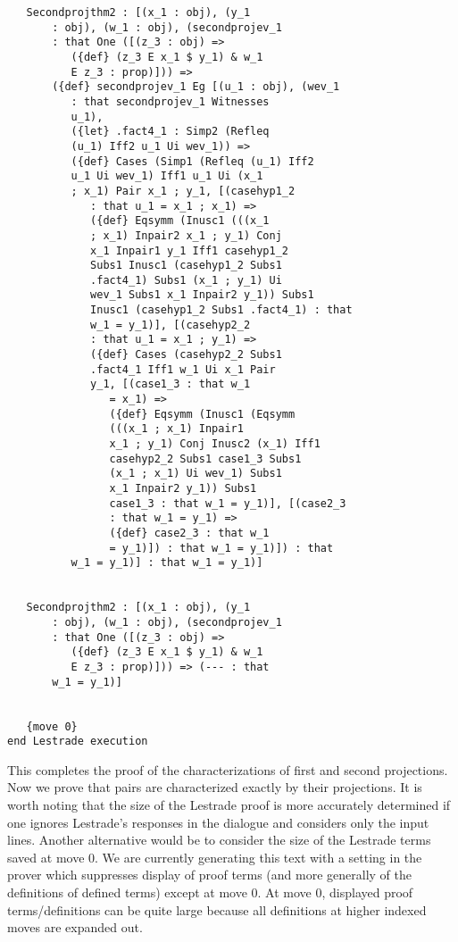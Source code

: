 \documentclass[12pt]{article}
\begin{document}
\begin{verbatim}
   Secondprojthm2 : [(x_1 : obj), (y_1 
       : obj), (w_1 : obj), (secondprojev_1 
       : that One ([(z_3 : obj) => 
          ({def} (z_3 E x_1 $ y_1) & w_1 
          E z_3 : prop)])) => 
       ({def} secondprojev_1 Eg [(u_1 : obj), (wev_1 
          : that secondprojev_1 Witnesses 
          u_1), 
          ({let} .fact4_1 : Simp2 (Refleq 
          (u_1) Iff2 u_1 Ui wev_1)) => 
          ({def} Cases (Simp1 (Refleq (u_1) Iff2 
          u_1 Ui wev_1) Iff1 u_1 Ui (x_1 
          ; x_1) Pair x_1 ; y_1, [(casehyp1_2 
             : that u_1 = x_1 ; x_1) => 
             ({def} Eqsymm (Inusc1 (((x_1 
             ; x_1) Inpair2 x_1 ; y_1) Conj 
             x_1 Inpair1 y_1 Iff1 casehyp1_2 
             Subs1 Inusc1 (casehyp1_2 Subs1 
             .fact4_1) Subs1 (x_1 ; y_1) Ui 
             wev_1 Subs1 x_1 Inpair2 y_1)) Subs1 
             Inusc1 (casehyp1_2 Subs1 .fact4_1) : that 
             w_1 = y_1)], [(casehyp2_2 
             : that u_1 = x_1 ; y_1) => 
             ({def} Cases (casehyp2_2 Subs1 
             .fact4_1 Iff1 w_1 Ui x_1 Pair 
             y_1, [(case1_3 : that w_1 
                = x_1) => 
                ({def} Eqsymm (Inusc1 (Eqsymm 
                (((x_1 ; x_1) Inpair1 
                x_1 ; y_1) Conj Inusc2 (x_1) Iff1 
                casehyp2_2 Subs1 case1_3 Subs1 
                (x_1 ; x_1) Ui wev_1) Subs1 
                x_1 Inpair2 y_1)) Subs1 
                case1_3 : that w_1 = y_1)], [(case2_3 
                : that w_1 = y_1) => 
                ({def} case2_3 : that w_1 
                = y_1)]) : that w_1 = y_1)]) : that 
          w_1 = y_1)] : that w_1 = y_1)]


   Secondprojthm2 : [(x_1 : obj), (y_1 
       : obj), (w_1 : obj), (secondprojev_1 
       : that One ([(z_3 : obj) => 
          ({def} (z_3 E x_1 $ y_1) & w_1 
          E z_3 : prop)])) => (--- : that 
       w_1 = y_1)]


   {move 0}
end Lestrade execution
\end{verbatim}

This completes the proof of the characterizations of first and second projections.  Now we prove that pairs are characterized exactly by their projections.  It is worth noting that
the size of the Lestrade proof is more accurately determined if one ignores Lestrade's responses in the dialogue and considers only the input lines.  Another alternative would be to consider the size of the Lestrade terms saved at move 0.  We are currently generating this text with a setting in the prover which suppresses display of proof terms
(and more generally of the definitions of defined terms) except at move 0.  At move 0, displayed proof terms/definitions can be quite large because all definitions at higher indexed moves are expanded out.
\end{document}
